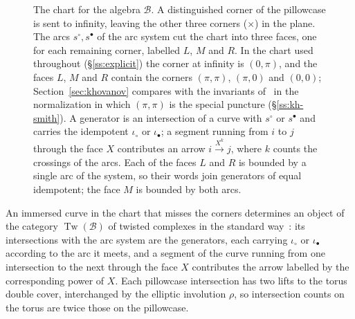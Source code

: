 \begin{figure}[ht]
\centering
{}
\medskip
\caption{The chart for the algebra $\mathcal B$. A distinguished corner of the pillowcase is sent to infinity,
leaving the other three corners ($\times$) in the plane. The arcs $s^{\circ},s^{\bullet}$ of the arc system cut the
chart into three faces, one for each remaining corner, labelled $L$, $M$ and $R$. In the chart used throughout
(\S\ref{ss:explicit}) the corner at infinity is $(0,\pi)$, and the faces $L$, $M$ and $R$ contain the corners
$(\pi,\pi)$, $(\pi,0)$ and $(0,0)$; Section~\ref{sec:khovanov} compares with the invariants of~\cite{KWZ} in the
normalization in which $(\pi,\pi)$ is the special puncture (\S\ref{ss:kh-smith}). A generator is an intersection
of a curve with $s^{\circ}$ or $s^{\bullet}$ and carries the idempotent $\iota_\circ$ or $\iota_\bullet$; a segment
running from $i$ to $j$ through the face $X$ contributes an arrow $i\xrightarrow{X^{k}}j$, where $k$ counts the
crossings of the arcs. Each of the faces $L$ and $R$ is bounded by a single arc of the system, so their words
join generators of equal idempotent; the face $M$ is bounded by both arcs.}
\label{fig:chart}
\end{figure}

An immersed curve in the chart that misses the corners determines an object of the category
$\operatorname{Tw}(\mathcal B)$ of twisted complexes in the standard way~\cite{KWZ}: its intersections with the arc
system are the generators, each carrying $\iota_\circ$ or $\iota_\bullet$ according to the arc it meets, and a
segment of the curve running from one intersection to the next through the face $X$ contributes the arrow
labelled by the corresponding power of $X$. Each pillowcase intersection has two lifts to the torus double cover,
interchanged by the elliptic involution $\rho$, so intersection counts on the torus are twice those on the
pillowcase.

